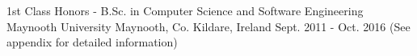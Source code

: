 \begin{cventries}
  \cventry
    {1st Class Honors - B.Sc. in Computer Science and Software Engineering}
    {Maynooth University}
    {Maynooth, Co. Kildare, Ireland}
    {Sept. 2011 - Oct. 2016}
    { (See appendix for detailed information)
    }
\end{cventries}
